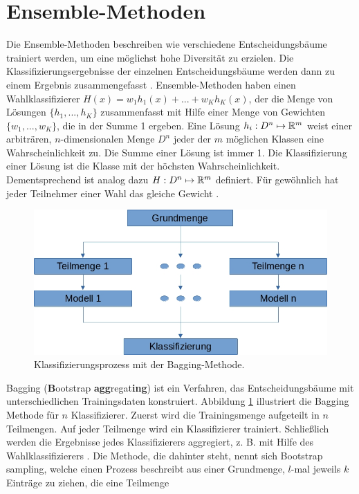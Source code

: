 \section{Ensemble-Methoden}
\label{sec:Ensemble}
\label{sec:wahlklassifizierer}
Die Ensemble-Methoden beschreiben wie verschiedene Entscheidungsbäume trainiert werden, um eine möglichst hohe Diversität zu erzielen. Die Klassifizierungsergebnisse der einzelnen Entscheidungsbäume werden
dann zu einem Ergebnis zusammengefasst \cite{dietterich2002ensemble}.
\newline
\newline
Ensemble-Methoden haben einen
Wahlklassifizierer $H(x) = w_1 h_1(x) + ... + w_K h_K(x)$, der die Menge von Lösungen $\{h_1, ..., h_K\}$ zusammenfasst mit Hilfe einer Menge von Gewichten $\{w_1, ..., w_K\}$, die in der Summe 1
ergeben. Eine Lösung $h_i: D^n \mapsto {\mathbb R}^m$ weist einer arbiträren, $n$-dimensionalen Menge $D^n$ jeder der $m$ möglichen Klassen eine Wahrscheinlichkeit zu.
Die Summe einer Lösung ist immer 1. Die Klassifizierung einer Lösung ist die Klasse mit der höchsten Wahrscheinlichkeit. Dementsprechend ist analog dazu $H: D^n \mapsto {\mathbb R}^m$ definiert.
Für gewöhnlich hat jeder Teilnehmer einer Wahl das gleiche Gewicht \cite{dietterich2002ensemble}.
\begin{figure}
    \centering
    \includegraphics[width=0.6\linewidth]{images/bagging.jpg}
    \caption{Klassifizierungsprozess mit der Bagging-Methode.}
    \label{fig:bagging}
\end{figure}
\newline
\newline
Bagging (\textbf{B}ootstrap \textbf{agg}regat\textbf{ing}) ist ein Verfahren, das Entscheidungsbäume mit unterschiedlichen Trainingsdaten konstruiert.
Abbildung \ref{fig:bagging} illustriert die Bagging Methode für $n$ Klassifizierer. Zuerst wird die Trainingsmenge
aufgeteilt in $n$ Teilmengen. Auf jeder Teilmenge wird ein Klassifizierer trainiert. Schließlich werden die Ergebnisse jedes Klassifizierers aggregiert, z. B. mit Hilfe des Wahlklassifizierers \cite{breiman1996bagging}.
Die Methode, die dahinter steht, nennt sich \glqq Bootstrap sampling\grqq, welche einen Prozess beschreibt aus einer Grundmenge, $l$-mal jeweils $k$ Einträge zu ziehen, die eine Teilmenge

